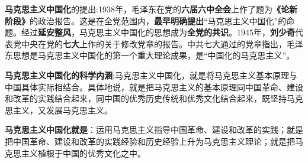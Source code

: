 \textbf{{马克思主义中国化}}的提出:1938年，毛泽东在党的\textbf{{六届六中全会}}上作了题为\textbf{{《论新阶段》}}的政治报告。这是在全党范围内，\textbf{{最早明确提出}}``马克思主义中国化''的命题。经过\textbf{{延安整风}}，马克思主义中国化的思想成为\textbf{{全党的共识}}。1945年，\textbf{{刘少奇}}代表党中央在党的\textbf{{七大}}上作的关于修改党章的报告。中共七大通过的党章指出，{毛泽东思想是马克思主义中国化的第一个重大理论成果，是}{``}{中国化的马克思主义''}。

\textbf{{马克思主义中国化的科学内涵}}:{马克思主义中国化，就是将马克思主义基本原理与中国具体实际相结合}。具体地说，就是把马克思主义的基本原理同中国革命、建设和改革的实践结合起来，同中国的优秀历史传统和优秀文化结合起来，既坚持马克思主义，又发展马克思主义。

\textbf{{马克思主义中国化就是}}{：}{运用马克思主义指导中国革命、建设和改革的实践}{；}{就是把中国革命、建设和改革的实践经验和历史经验上升为马克思主义理论}{；}{就是把马克思主义植根于中国的优秀文化之中}{。}
